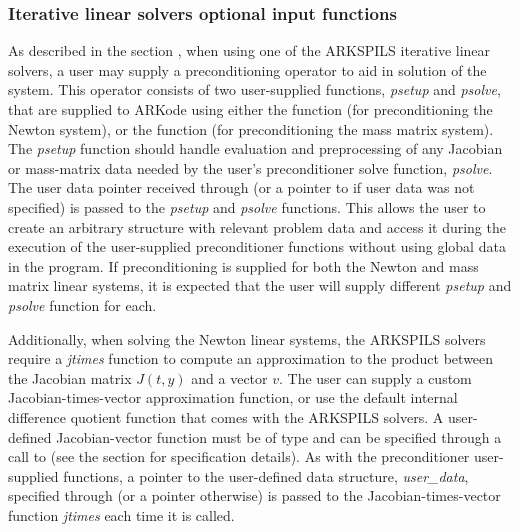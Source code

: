 \documentclass[letterpaper,10pt,english]{sphinxmanual}
\begin{document}
\subsubsection{Iterative linear solvers optional input functions}
\label{c_interface/User_callable:iterative-linear-solvers-optional-input-functions}\label{c_interface/User_callable:cinterface-arkspilsinputs}
As described in the section {\hyperref[Mathematics:mathematics-linear]{\emph{}}}, when using one
of the ARKSPILS iterative linear solvers, a user may supply a
preconditioning operator to aid in solution of the system.  This
operator consists of two user-supplied functions, \emph{psetup} and
\emph{psolve}, that are supplied to ARKode using either the function
{\hyperref[c_interface/User_callable:c.ARKSpilsSetPreconditioner]{\emph{}}} (for preconditioning the
Newton system), or the function
{\hyperref[c_interface/User_callable:c.ARKSpilsSetMassPreconditioner]{\emph{}}} (for preconditioning the
mass matrix system).  The \emph{psetup} function should handle evaluation
and preprocessing of any Jacobian or mass-matrix data needed by the
user's preconditioner solve function, \emph{psolve}.  The user data pointer
received through {\hyperref[c_interface/User_callable:c.ARKodeSetUserData]{\emph{}}} (or a pointer to
 if user data was not specified) is passed to the \emph{psetup} and
\emph{psolve} functions.  This allows the user to create an arbitrary
structure with relevant problem data and access it during the
execution of the user-supplied preconditioner functions without using
global data in the program.  If preconditioning is supplied for both
the Newton and mass matrix linear systems, it is expected that the
user will supply different \emph{psetup} and \emph{psolve} function for each.

Additionally, when solving the Newton linear systems, the ARKSPILS
solvers require a \emph{jtimes} function to compute an approximation to the
product between the Jacobian matrix \(J(t,y)\) and a vector
\(v\). The user can supply a custom Jacobian-times-vector
approximation function, or use the default internal difference
quotient function that comes with the ARKSPILS solvers.  A
user-defined Jacobian-vector function must be of type
{\hyperref[c_interface/User_supplied:c.ARKSpilsJacTimesVecFn]{\emph{}}} and can be specified through a call
to {\hyperref[c_interface/User_callable:c.ARKSpilsSetJacTimesVecFn]{\emph{}}} (see the section
{\hyperref[c_interface/User_supplied:cinterface-usersupplied]{\emph{}}} for specification details).  As with the
preconditioner user-supplied functions, a pointer to the user-defined
data structure, \emph{user\_data}, specified through
{\hyperref[c_interface/User_callable:c.ARKodeSetUserData]{\emph{}}} (or a  pointer otherwise) is
passed to the Jacobian-times-vector function \emph{jtimes} each time it
is called.
\end{document}
